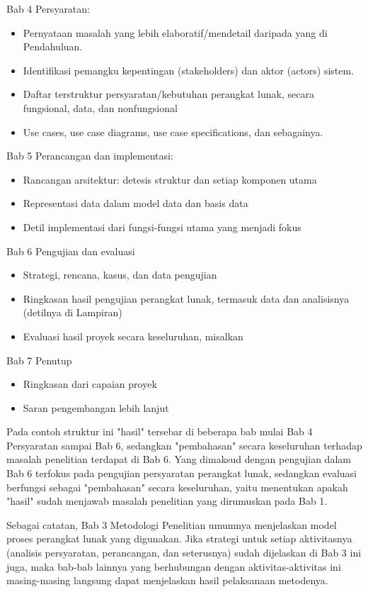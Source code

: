 \begin{displayquote}
  Bab 4 Persyaratan:
  \begin{itemize}
    \item Pernyataan masalah yang lebih elaboratif/mendetail daripada yang di Pendahuluan.
    \item Identifikasi pemangku kepentingan (stakeholders) dan aktor (actors) sistem.
    \item Daftar terstruktur persyaratan/kebutuhan perangkat lunak, secara fungsional, data, dan nonfungsional
    \item Use cases, use case diagrams, use case specifications, dan sebagainya. 
  \end{itemize} 
  Bab 5 Perancangan dan implementasi:
  \begin{itemize}
    \item Rancangan arsitektur: detesis struktur dan setiap komponen utama
    \item Representasi data dalam model data dan basis data
    \item Detil implementasi dari fungsi-fungsi utama yang menjadi fokus
  \end{itemize}
  Bab 6 Pengujian dan evaluasi
  \begin{itemize}
    \item Strategi, rencana, kasus, dan data pengujian
    \item Ringkasan hasil pengujian perangkat lunak, termasuk data dan analisisnya (detilnya di Lampiran)
    \item Evaluasi hasil proyek secara keseluruhan, misalkan 
  \end{itemize}
  Bab 7 Penutup
  \begin{itemize}
    \item Ringkasan dari capaian proyek
    \item Saran pengembangan lebih lanjut
  \end{itemize}
\end{displayquote}

Pada contoh struktur ini "hasil" tersebar di beberapa bab mulai Bab 4 Persyaratan sampai Bab 6, sedangkan "pembahasan" secara keseluruhan terhadap masalah penelitian terdapat di Bab 6. Yang dimaksud dengan pengujian dalam Bab 6 terfokus pada pengujian persyaratan perangkat lunak, sedangkan evaluasi berfungsi sebagai "pembahasan" secara keseluruhan, yaitu menentukan apakah "hasil" sudah menjawab masalah penelitian yang dirumuskan pada Bab 1. 

Sebagai catatan, Bab 3 Metodologi Penelitian umumnya menjelaskan model proses perangkat lunak yang digunakan. Jika strategi untuk setiap aktivitasnya (analisis persyaratan, perancangan, dan seterusnya) sudah dijelaskan di Bab 3 ini juga, maka bab-bab lainnya yang berhubungan dengan aktivitas-aktivitas ini masing-masing langsung dapat menjelaskan hasil pelaksanaan metodenya. 

